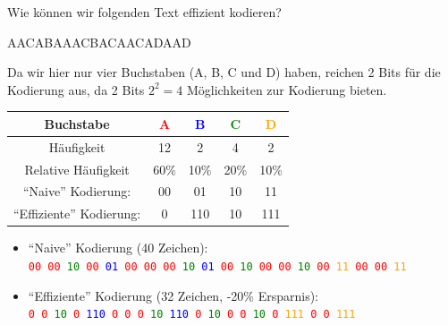 Wie können wir folgenden Text effizient kodieren?

\begin{center}
	AACABAAACBACAACADAAD
\end{center}

Da wir hier nur vier Buchstaben (A, B, C und D) haben, reichen 2 Bits für die Kodierung aus, da 2 Bits $2^2=4$ Möglichkeiten zur Kodierung bieten.

\begin{table}[H]
	\centering
	\begin{tabular}{c|c|c|c|c}
		\textbf{Buchstabe}        & \textbf{\textcolor{red}{A}} & \textbf{\textcolor{blue}{B}} & \textbf{\textcolor{green}{C}} & \textbf{\textcolor{orange}{D}} \\\midrule\midrule
		Häufigkeit                & 12         & 2          & 4          & 2          \\\hline
		Relative Häufigkeit       & 60\%       & 10\%       & 20\%       & 10\%       \\\hline
		\enquote{Naive} Kodierung:      & 00         & 01         & 10         & 11         \\\hline
		\enquote{Effiziente} Kodierung: & 0          & 110        & 10         & 111        \\
	\end{tabular}
\end{table}
\begin{itemize}
	\item \enquote{Naive} Kodierung (40 Zeichen):\\ \texttt{\textcolor{red}{00} \textcolor{red}{00} \textcolor{green}{10} \textcolor{red}{00} \textcolor{blue}{01} \textcolor{red}{00} \textcolor{red}{00} \textcolor{red}{00} \textcolor{green}{10} \textcolor{blue}{01} \textcolor{red}{00} \textcolor{green}{10} \textcolor{red}{00} \textcolor{red}{00} \textcolor{green}{10} \textcolor{red}{00} \textcolor{orange}{11} \textcolor{red}{00} \textcolor{red}{00} \textcolor{orange}{11}}
	\item \enquote{Effiziente} Kodierung (32 Zeichen, -20\% Ersparnis):\\ \texttt{\textcolor{red}{0} \textcolor{red}{0} \textcolor{green}{10} \textcolor{red}{0} \textcolor{blue}{110} \textcolor{red}{0} \textcolor{red}{0} \textcolor{red}{0} \textcolor{green}{10} \textcolor{blue}{110} \textcolor{red}{0} \textcolor{green}{10} \textcolor{red}{0} \textcolor{red}{0} \textcolor{green}{10} \textcolor{red}{0} \textcolor{orange}{111} \textcolor{red}{0} \textcolor{red}{0} \textcolor{orange}{111}}\\

\end{itemize}

